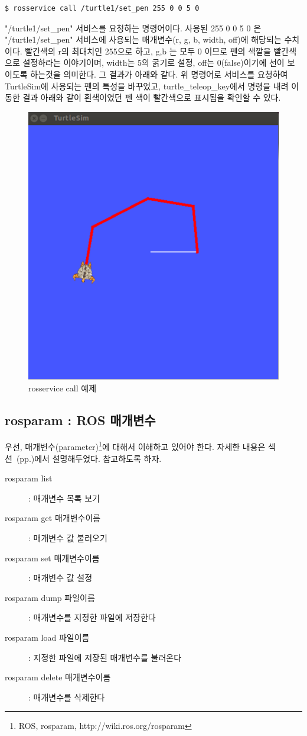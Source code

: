 \begin{lstlisting}[language=ROS]
$ rosservice call /turtle1/set_pen 255 0 0 5 0
\end{lstlisting}

\noindent
"/turtle1/set\_pen" 서비스를 요청하는 명령어이다. 사용된 255 0 0 5 0 은 "/turtle1/set\_pen" 서비스에 사용되는 매개변수(r, g, b, width, off)에 해당되는 수치이다.  빨간색의 r의 최대치인 255으로 하고, g,b 는 모두 0 이므로 펜의 색깔을 빨간색으로 설정하라는 이야기이며, width는 5의 굵기로 설정, off는 0(false)이기에 선이 보이도록 하는것을 의미한다. 그 결과가 아래와 같다. 위 명령어로 서비스를 요청하여 TurtleSim에 사용되는 펜의 특성을 바꾸었고, turtle\_teleop\_key에서 명령을 내려 이동한 결과 아래와 같이 흰색이였던 펜 색이 빨간색으로 표시됨을 확인할 수 있다.

\begin{figure}[h]
\centering\includegraphics[width=0.5\columnwidth]{pictures/chapter5/rosservice_call.png}
\caption{rosservice call 예제}
\end{figure}

\newpage
\subsection{rosparam : ROS 매개변수}

우선, 매개변수(parameter)\footnote{ROS, rosparam, http://wiki.ros.org/rosparam}에 대해서 이해하고 있어야 한다. 자세한 내용은 섹션~(pp.\pageref{def:RosParameter})에서 설명해두었다. 참고하도록 하자.

\vspace{\baselineskip}
\noindent
\begin{description}
\item[rosparam list] : 매개변수 목록 보기
\item[rosparam get 매개변수이름] : 매개변수 값 불러오기
\item[rosparam set 매개변수이름] : 매개변수 값 설정 
\item[rosparam dump 파일이름] : 매개변수를 지정한 파일에 저장한다
\item[rosparam load 파일이름] : 지정한 파일에 저장된 매개변수를 불러온다
\item[rosparam delete 매개변수이름] : 매개변수를 삭제한다 
\end{description}

